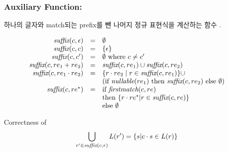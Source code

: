 \begin{frame}[shrink]
\frametitle{Auxiliary Function: \suffix}

하나의 글자와 match되는 prefix를 뺀 나머지 정규 표현식을 계산하는 함수 \suffix.

    \[
    \begin{array}{rcl}
      \suffix(c,\e) & = & \emptyset \\
      \suffix(c,c)&=&\{\e\} \\
      \suffix(c,c')&=&\emptyset\mrm{ where }c\neq c' \\
      \suffix(c,\replus) &=& \suffix(c,\rone) \cup \suffix(c,\rtwo) \\

      \suffix(c,\rone\cdot \rtwo)& = & \{ r\cdot \rtwo \mid r \in
      \suffix(c,\rone) \} \cup \\
      &   & (\ifte{\nullable(\rone)}{\suffix(c,\rtwo)}{\emptyset}) \\


      \suffix(c,re^{*}) &=& \mrm{if }\firstmatch(c,re) \\
                        & & \mrm{then }\{r\cdot re^{*}|r\in\suffix(c,re)\} \\
                        & & \mrm{else }\emptyset
    \end{array}
    \]

\begin{block}{Correctness of \suffix}
\[
    \bigcup_{r'\in \textit{suffix}(c,r)}L(r') = \{ s | c\cdot s \in L(r) \}
  \]
\end{block}

\end{frame}


